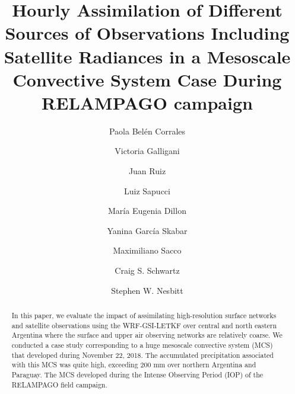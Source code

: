 \documentclass[authoryear,preprint,review,12pt]{elsarticle} %
\begin{document}
\begin{frontmatter}

  \title{Hourly Assimilation of Different Sources of Observations Including Satellite Radiances in a Mesoscale Convective System Case During RELAMPAGO campaign}
    \author[UBA,CIMA,CNRS]{Paola Belén Corrales}
    \author[UBA,CIMA,CNRS]{Victoria Galligani}
  
    \author[UBA,CIMA,CNRS]{Juan Ruiz}
  
    \author[INPE]{Luiz Sapucci}
  
    \author[SMN,CONICET]{María Eugenia Dillon}
  
    \author[SMN,CONICET,CNRS]{Yanina García Skabar}
  
    \author[SMN]{Maximiliano Sacco}
  
    \author[NCAR]{Craig S. Schwartz}
  
    \author[Illinois]{Stephen W. Nesbitt}
  
      \address[UBA]{Universidad de Buenos Aires, Facultad de Ciencias Exactas y Naturales, Departamento de Ciencias de la Atmósfera y los Océanos. Buenos Aires, Argentina.}
    \address[CIMA]{CONICET -- Universidad de Buenos Aires. Centro de Investigaciones del Mar y la Atmósfera (CIMA). Buenos Aires, Argentina.}
    \address[CNRS]{CNRS -- IRD -- CONICET -- UBA. Instituto Franco-Argentino para el Estudio del Clima y sus Impactos (IRL 3351 IFAECI). Buenos Aires, Argentina.}
    \address[SMN]{Servicio Meteorológico Nacional de Argentina.}
    \address[CONICET]{CONICET (Consejo Nacional de Investigaciones Científicas y Técnicas).}
    \address[INPE]{National Institute for Space Research, Brazil, Center for Weather Forecasting and Climate Studies.}
    \address[NCAR]{National Center for Atmospheric Research, Boulder, Colorado.}
    \address[Illinois]{Department of Atmospheric Sciences, University of Illinois at Urbana--Champaign, Urbana, Illinois.}
  
  \begin{abstract}
  In this paper, we evaluate the impact of assimilating high-resolution surface networks and satellite observations using the WRF-GSI-LETKF over central and north eastern Argentina where the surface and upper air observing networks are relatively coarse. We conducted a case study corresponding to a huge mesoscale convective system (MCS) that developed during November 22, 2018. The accumulated precipitation associated with this MCS was quite high, exceeding 200 mm over northern Argentina and Paraguay. The MCS developed during the Intense Observing Period (IOP) of the RELAMPAGO field campaign.
  

\end{abstract}
\end{frontmatter}
\end{document}
